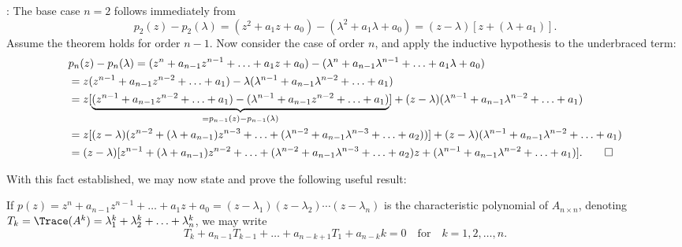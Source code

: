 \/: The base case $n=2$ follows immediately from
\begin{equation*}
p_2(z)-p_2(\lambda) = (z^2+a_1 z + a_0) - (\lambda^2+a_1 \lambda + a_0) = (z-\lambda)[z + (\lambda + a_1)].
\end{equation*}
Assume the theorem holds for order $n-1$.  Now consider the case of order $n$, and apply the inductive hypothesis to the underbraced term:
\begin{align}
  & p_n(z) - p_n(\lambda)
    = (z^n + a_{n-1} z^{n-1} + \ldots + a_{1} z + a_{0}) - (\lambda^n + a_{n-1} \lambda^{n-1} + \ldots + a_{1} \lambda + a_{0}) \notag \\
   & = z (z^{n-1} + a_{n-1} z^{n-2} + \ldots + a_{1}) - \lambda (\lambda^{n-1} + a_{n-1} \lambda^{n-2} + \ldots + a_{1}) \notag \\
   & = z [\underbrace{(z^{n-1} + a_{n-1} z^{n-2} + \ldots + a_{1}) - (\lambda^{n-1} + a_{n-1} z^{n-2} + \ldots + a_{1})}_{=p_{n-1}(z) - p_{n-1}(\lambda)}]
   + (z- \lambda) (\lambda^{n-1} + a_{n-1} \lambda^{n-2} + \ldots + a_{1}) \notag \\
   & = z [(z-\lambda)(z^{n-2} + (\lambda + a_{n-1}) z^{n-3} + \ldots +  (\lambda^{n-2} + a_{n-1} \lambda^{n-3} + \ldots + a_{2}))] + (z- \lambda) (\lambda^{n-1} + a_{n-1} \lambda^{n-2} + \ldots + a_{1}) \notag \\
   & = (z-\lambda) [z^{n-1} + (\lambda + a_{n-1}) z^{n-2} + \ldots +  (\lambda^{n-2} + a_{n-1} \lambda^{n-3} + \ldots + a_{2}) z + (\lambda^{n-1} + a_{n-1} \lambda^{n-2} + \ldots + a_{1})].     \tag*{$\Box$}
\end{align}
\clearpage

\noindent With this fact established, we may now state and prove the following useful result:

\begin{fact}\label{fact:Tkfork=12n} If $p(z)=z^n + a_{n-1} z^{n-1} + \ldots + a_{1} z + a_{0}=(z-\lambda_1)(z-\lambda_2)\cdots(z-\lambda_n)$ is the characteristic polynomial of $A_{n\times n}$, denoting
$T_k=\Trace(A^k)=\lambda_1^k + \lambda_2^k + \ldots + \lambda_n^k$, we may write
\begin{equation*}
  T_k + a_{n-1} T_{k-1} + \ldots + a_{n-k+1} T_{1} + a_{n-k} k =0 \quad \textrm{for}\quad k=1,2,\ldots,n.
\end{equation*}
\end{fact}

